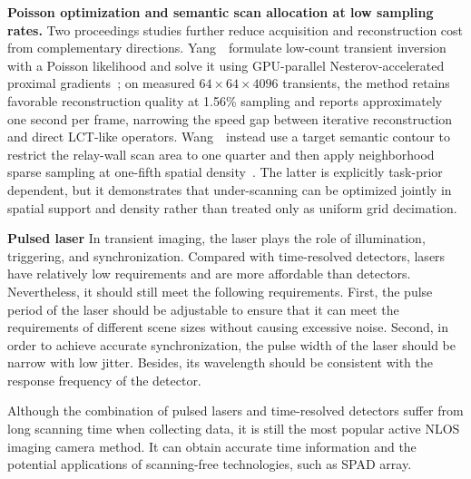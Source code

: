 \vspace{0.8mm}
\noindent \textbf{Poisson optimization and semantic scan allocation at low sampling rates.}
Two proceedings studies further reduce acquisition and reconstruction cost from complementary directions. Yang~\etal~formulate low-count transient inversion with a Poisson likelihood and solve it using GPU-parallel Nesterov-accelerated proximal gradients~\cite{yangPoissonLowSamplingNLOS2026}; on measured $64\times64\times4096$ transients, the method retains favorable reconstruction quality at 1.56\% sampling and reports approximately one second per frame, narrowing the speed gap between iterative reconstruction and direct LCT-like operators. Wang~\etal~instead use a target semantic contour to restrict the relay-wall scan area to one quarter and then apply neighborhood sparse sampling at one-fifth spatial density~\cite{wangSemanticUndersamplingNLOS2026}. The latter is explicitly task-prior dependent, but it demonstrates that under-scanning can be optimized jointly in spatial support and density rather than treated only as uniform grid decimation.


\vspace{0.8mm}
\noindent \textbf{Pulsed laser}
In transient imaging, the laser plays the role of illumination, triggering, and synchronization. Compared with time-resolved detectors, lasers have relatively low requirements and are more affordable than detectors. Nevertheless, it should still meet the following requirements. First, the pulse period of the laser should be adjustable to ensure that it can meet the requirements of different scene sizes without causing excessive noise. Second, in order to achieve accurate synchronization, the pulse width of the laser should be narrow with low jitter. Besides, its wavelength should be consistent with the response frequency of the detector.

Although the combination of pulsed lasers and time-resolved detectors suffer from long scanning time when collecting data, it is still the most popular active NLOS imaging camera method. It can obtain accurate time information and the potential applications of scanning-free technologies, such as SPAD array\cite{jinScannerlessNonlineofsightThree2020,nam_real-time_2020,pei_dynamic_2021}.


